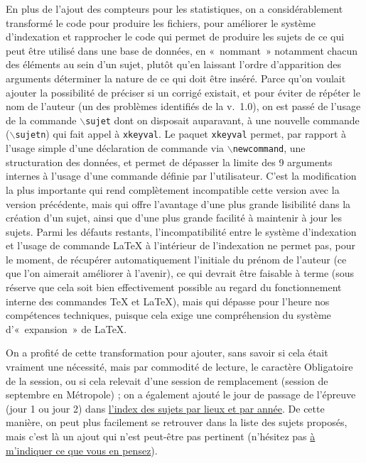 En plus de l'ajout des compteurs pour les statistiques, on a considérablement transformé le code pour produire les fichiers, pour améliorer le système d'indexation et rapprocher le code qui permet de produire les sujets de ce qui peut être utilisé dans une base de données, en «~nommant~» notamment chacun des éléments au sein d'un sujet, plutôt qu'en laissant l'ordre d'apparition des arguments déterminer la nature de ce qui doit être inséré. Parce qu'on voulait ajouter la possibilité de préciser si un corrigé existait, et pour éviter de répéter le nom de l'auteur (un des problèmes identifiés de la v.~1.0), on est passé de l'usage de la commande \texttt{$\backslash$sujet} dont on disposait auparavant, à une nouvelle commande (\texttt{$\backslash$sujetn}) qui fait appel à \texttt{xkeyval}. Le paquet \texttt{xkeyval} permet, par rapport à l'usage simple d'une déclaration de commande via \texttt{$\backslash$newcommand}, une structuration des données, et permet de dépasser la limite des 9 arguments internes à l'usage d'une commande définie par l'utilisateur. C'est la modification la plus importante qui rend complètement incompatible cette version avec la version précédente, mais qui offre l'avantage d'une plus grande lisibilité dans la création d'un sujet, ainsi que d'une plus grande facilité à maintenir à jour les sujets. Parmi les défauts restants, l'incompatibilité entre le système d'indexation et l'usage de commande \LaTeX{} à l'intérieur de l'indexation ne permet pas, pour le moment, de récupérer automatiquement l'initiale du prénom de l'auteur (ce que l'on aimerait améliorer à l'avenir), ce qui devrait être faisable à terme (sous réserve que cela soit bien effectivement possible au regard du fonctionnement interne des commandes \TeX{} et \LaTeX{}), mais qui dépasse pour l'heure nos compétences techniques, puisque cela exige une compréhension du système d'«~expansion~» de \LaTeX{}.

On a profité de cette transformation pour ajouter, sans savoir si cela était vraiment une nécessité, mais par commodité de lecture, le caractère Obligatoire de la session, ou si cela relevait d'une session de remplacement (session de septembre en Métropole) ; on a également ajouté le jour de passage de l'épreuve (jour 1 ou jour 2) dans \hyperlink{indexn}{l'index des sujets par lieux et par année}. De cette manière, on peut plus facilement se retrouver dans la liste des sujets proposés, mais c'est là un ajout qui n'est peut-être pas pertinent (n'hésitez pas \href{mailto:mikael.quesseveur@ac-lille.fr}{à m'indiquer ce que vous en pensez}).

